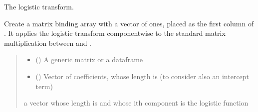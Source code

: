 \documentclass[letterpaper,10pt,english]{sphinxmanual}
\begin{document}
\begin{fulllineitems}
\label{\detokenize{cubmods:cubmods.general.logis}}
\pysigstartsignatures
{}
\pysigstopsignatures
\sphinxAtStartPar
The logistic transform.

\sphinxAtStartPar
Create a matrix  binding array  with a vector of ones, placed as the first column of . 
It applies the logistic transform componentwise to the standard matrix multiplication between  and .
\begin{quote}\begin{description}
\begin{itemize}
\item {} 
\sphinxAtStartPar
{} (\sphinxstyleliteralemphasis{\sphinxupquote{, }}) \textendash{} A generic matrix or a dataframe

\item {} 
\sphinxAtStartPar
{} () \textendash{} Vector of coefficients, whose length is  (to consider also an intercept term)

\end{itemize}

\sphinxAtStartPar
a vector whose length is  and whose i\sphinxhyphen{}th component is the logistic function

\end{description}\end{quote}

\end{fulllineitems}

\end{document}
